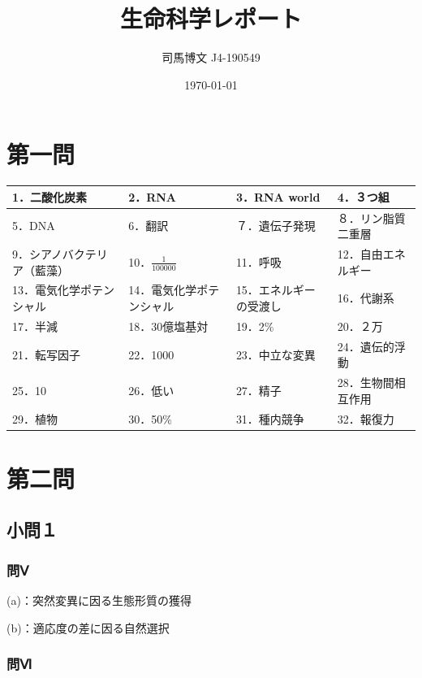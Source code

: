 \documentclass[uplatex, dvipdfmx]{jsarticle}
\title{生命科学レポート}
\author{司馬博文 J4-190549}
\date{\today}
\begin{document}
\maketitle
\section{第一問}

\begin{table}[htb]
    \begin{center}\begin{tabular}{|l|l|l|l|} \hline
        1．二酸化炭素 & 2．RNA & 3．RNA world & 4．３つ組 \\ \hline
        5．DNA & 6．翻訳 & ７．遺伝子発現 & ８．リン脂質二重層 \\ \hline
        9．シアノバクテリア（藍藻）&10．$\frac{1}{100000}$&11．呼吸&12．自由エネルギー \\ \hline
        13．電気化学ポテンシャル&14．電気化学ポテンシャル&15．エネルギーの受渡し&16．代謝系 \\ \hline
        17．半減&18．30億塩基対&19．2\%&20．２万\\\hline
        21．転写因子&22．1000&23．中立な変異&24．遺伝的浮動\\\hline
        25．10&26．低い&27．精子&28．生物間相互作用 \\\hline
        29．植物&30．50\%&31．種内競争&32．報復力\\\hline
    \end{tabular}\end{center}
\end{table}

\section{第二問}

\subsection{小問１}
\subsubsection{問Ⅴ}

(a)：突然変異に因る生態形質の獲得

(b)：適応度の差に因る自然選択

\subsubsection{問Ⅵ}
\end{document}

